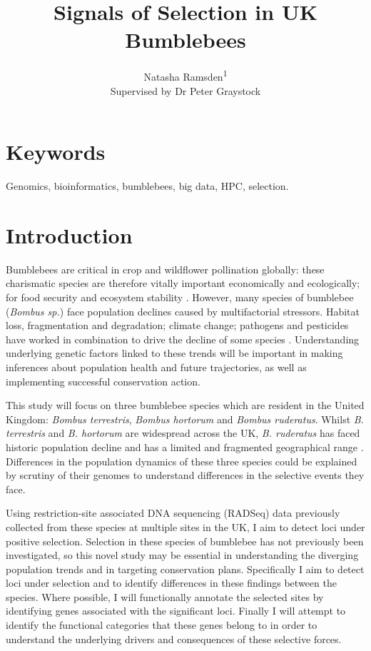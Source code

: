 \documentclass[11pt]{article}
\title{Signals of Selection in UK Bumblebees}
\author[1]{Natasha Ramsden\textsuperscript{1}\\Supervised by Dr Peter Graystock}
\affil[1]{Imperial College London}
\date{}
\begin{document}
    \begin{titlepage}
    \maketitle
    \thispagestyle{empty}
    \end{titlepage}
    
    \begin{linenumbers}
    
    \section{Keywords}
    
    Genomics, bioinformatics, bumblebees, big data, HPC, selection.
    
    \section{Introduction}
    
    Bumblebees are critical in crop and wildflower pollination globally: these charismatic species are therefore vitally important economically and ecologically; for food security and ecosystem stability \citep{goulson_decline_2008, cameron_global_2020, sun_genus-wide_2021}. However, many species of bumblebee (\emph{Bombus sp.}) face population declines caused by multifactorial stressors. Habitat loss, fragmentation and degradation; climate change; pathogens and pesticides have worked in combination to drive the decline of some species \citep{goulson_decline_2008, cameron_global_2020}. Understanding underlying genetic factors linked to these trends will be important in making inferences about population health and future trajectories, as well as implementing successful conservation action.
    
    This study will focus on three bumblebee species which are resident in the United Kingdom: \emph{Bombus terrestris}, \emph{Bombus hortorum} and \emph{Bombus ruderatus}. Whilst \emph{B. terrestris} and \emph{B. hortorum} are widespread across the UK, \emph{B. ruderatus} has faced historic population decline and has a limited and fragmented geographical range \citep{ellis_delineating_2005}. Differences in the population dynamics of these three species could be explained by scrutiny of their genomes to understand differences in the selective events they face. 
    
    Using restriction-site associated DNA sequencing (RADSeq) data previously collected from these species at multiple sites in the UK, I aim to detect loci under positive selection. Selection in these species of bumblebee has not previously been investigated, so this novel study may be essential in understanding the diverging population trends and in targeting conservation plans. Specifically I aim to detect loci under selection and to identify differences in these findings between the species. Where possible, I will functionally annotate the selected sites by identifying genes associated with the significant loci. Finally I will attempt to identify the functional categories that these genes belong to in order to understand the underlying drivers and consequences of these selective forces.
    

\end{linenumbers}
\end{document}
